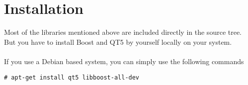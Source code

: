 \documentclass[]{article}
\begin{document}
\section{Installation}

Most of the libraries mentioned above are included directly in the source tree. But you have to install Boost and QT5 by yourself locally on your system.
\\\\
If you use a Debian based system, you can simply use the following commands

\begin{lstlisting}[frame=single]
# apt-get install qt5 libboost-all-dev
\end{lstlisting}
\end{document}
